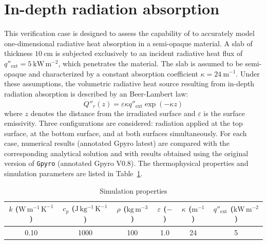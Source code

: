 \documentclass[12pt]{article}
\begin{document}
\fi

\section{In-depth radiation absorption}

This verification case is designed to assess the capability of  to accurately model one-dimensional radiative heat absorption in a semi-opaque material. A slab of thickness $10~\mathrm{cm}$ is subjected exclusively to an incident radiative heat flux of $q''_{\mathrm{ext}} = 5~\mathrm{kW\,m^{-2}}$, which penetrates the material. The slab is assumed to be semi-opaque and characterized by a constant absorption coefficient $\kappa = 24~\mathrm{m^{-1}}$. Under these assumptions, the volumetric radiative heat source resulting from in-depth radiation absorption is described by an Beer-Lambert law:
\begin{equation}
\dot{Q}''_r(z) = \varepsilon \kappa q''_{\mathrm{ext}} \exp\left( -\kappa z \right)
\end{equation}
where $z$ denotes the distance from the irradiated surface and $\varepsilon$ is the surface emissivity.
Three configurations are considered: radiation applied at the top surface, at the bottom surface, and at both surfaces simultaneously. For each case, numerical results (annotated Gpyro latest) are compared with the corresponding analytical solution and with results obtained using the original version of \texttt{Gpyro} (annotated Gpyro V0.8). The thermophysical properties and simulation parameters are listed in Table~\ref{tab:simu_props_raddepth}.


\begin{table}[H]
\centering
\small
\caption{Simulation properties}
\label{tab:simu_props_raddepth}
\renewcommand{\arraystretch}{1.3}
\begin{tabular}{c c c c c c}
\hline
$k$ ($\mathrm{W\,m^{-1}\,K^{-1}}$) & 
$c_p$ ($\mathrm{J\,kg^{-1}\,K^{-1}}$) & 
$\rho$ ($\mathrm{kg\,m^{-3}}$) & 
$\varepsilon$ ($-$) &
$\kappa$ ($\mathrm{m^{-1}}$) &
$q''_{\mathrm{ext}}$ ($\mathrm{kW\,m^{-2}}$) \\
\hline
0.10 & 1000 & 100 & 1.0 & 24 & 5 \\
\hline
\end{tabular}
\end{table}
\end{document}

